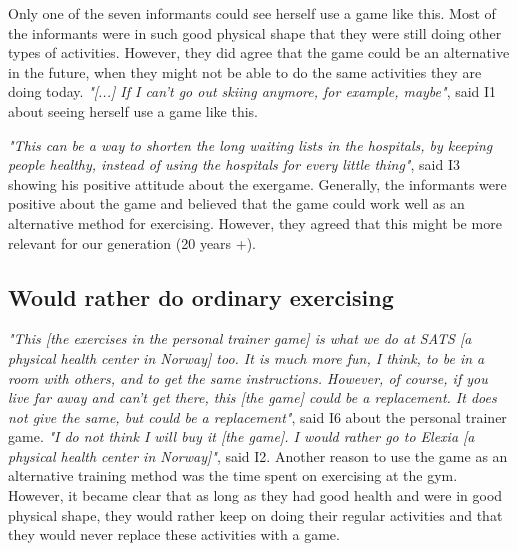 Only one of the seven informants could see herself use a game like this. Most of the informants were in such good physical shape that they were still doing other types of activities. However, they did agree that the game could be an alternative in the future, when they might not be able to do the same activities they are doing today. \emph{"[...] If I can't go out skiing anymore, for example, maybe"}, said I1 about seeing herself use a game like this. 

\emph{"This can be a way to shorten the long waiting lists in the hospitals, by keeping people healthy, instead of using the hospitals for every little thing"}, said I3 showing his positive attitude about the exergame. Generally, the informants were positive about the game and believed that the game could work well as an alternative method for exercising. However, they agreed that this might be more relevant for our generation (20 years +). 

\subsection{Would rather do ordinary exercising}
\emph{"This [the exercises in the personal trainer game] is what we do at SATS [a physical health center in Norway] too. It is much more fun, I think, to be in a room with others, and to get the same instructions. However, of course, if you live far away and can't get there, this [the game] could be a replacement. It does not give the same, but could be a replacement"}, said I6 about the personal trainer game. \emph{"I do not think I will buy it [the game]. I would rather go to Elexia [a physical health center in Norway]"}, said I2. Another reason to use the game as an alternative training method was the time spent on exercising at the gym. However, it became clear that as long as they had good health and were in good physical shape, they would rather keep on doing their regular activities and that they would never replace these activities with a game. 



